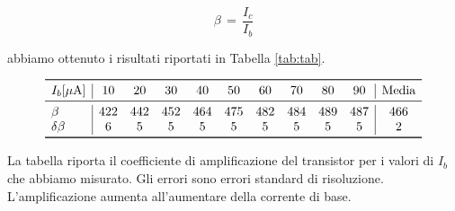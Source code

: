 \begin{equation}
	\beta \,=\, \frac{I_c}{I_b}
\end{equation}

abbiamo ottenuto i risultati riportati in Tabella \ref{tab:tab}.

\begin{table}[b!]
    \centering
    \footnotesize
    \[
    \begin{array}{l | c c c c c c c c c | c}
        \toprule
        I_b [\mu\text{A}] & 10 & 20 & 30 & 40 & 50 & 60 & 70 & 80 & 90 & \text{Media} \\
        \midrule 
        \beta & 422 & 442 & 452 & 464 & 475 & 482 & 484 & 489 & 487 & 466 \\
        \delta\beta & 6 & 5 & 5 & 5 & 5 & 5 & 5 & 5 & 5 & 2 \\
        \bottomrule
    \end{array}\]
    \caption{La tabella riporta il coefficiente di amplificazione del transistor per i valori di $I_b$ che abbiamo
        misurato. Gli errori sono errori standard di risoluzione. L'amplificazione aumenta
        all'aumentare della corrente di base.}
    \label{tab:tab}
\end{table}
